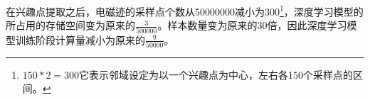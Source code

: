 {	在兴趣点提取之后，电磁迹的采样点个数从50000000减小为300\footnote{$150*2=300$它表示邻域设定为以一个兴趣点为中心，左右各150个采样点的区间。}，深度学习模型的所占用的存储空间变为原来的$\frac{3}{500000}$。样本数量变为原来的30倍，因此深度学习模型训练阶段计算量减小为原来的$\frac{9}{50000}$。
	
	
}
